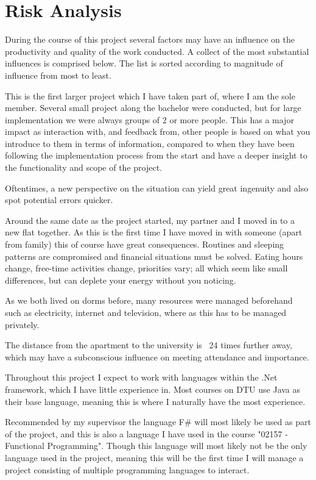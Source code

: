\section{Risk Analysis}\label{sec:RiskAnalysis}
During the course of this project several factors may have an influence on the productivity and quality of the work conducted. A collect of the most substantial influences is comprised below. The list is sorted according to magnitude of influence from most to least.

This is the first larger project which I have taken part of, where I am the sole member. Several small project along the bachelor were conducted, but for large implementation we were always groups of 2 or more people. This has a major impact as interaction with, and feedback from, other people is based on what you introduce to them in terms of information, compared to when they have been following the implementation process from the start and have a deeper insight to the functionality and scope of the project.

Oftentimes, a new perspective on the situation can yield great ingenuity and also spot potential errors quicker. 

Around the same date as the project started, my partner and I moved in to a new flat together. As this is the first time I have moved in with someone (apart from family) this of course have great consequences. Routines and sleeping patterns are compromised and financial situations must be solved. Eating hours change, free-time activities change, priorities vary; all which seem like small differences, but can deplete your energy without you noticing.

As we both lived on dorms before, many resources were managed beforehand such as electricity, internet and television, where as this has to be managed privately. 

The distance from the apartment to the university is ~24 times further away, which may have a subconscious influence on meeting attendance and importance.

Throughout this project I expect to work with languages within the .Net framework, which I have little experience in. Most courses on DTU use Java as their base language, meaning this is where I naturally have the most experience. 

Recommended by my supervisor the language F\# will most likely be used as part of the project, and this is also a language I have used in the course "02157 - Functional Programming". Though this language will most likely not be the only language used in the project, meaning this will be the first time I will manage a project consisting of multiple programming languages to interact.

